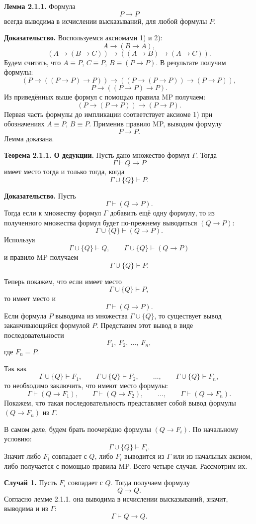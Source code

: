 \documentclass[12pt,letterpaper]{article}
\begin{document}
\textbf{Лемма 2.1.1.} Формула
\[
P \to P
\]
всегда выводима в исчислении высказываний, для любой формулы $P$.

\textbf{Доказательство.} Воспользуемся аксиомами 1) и 2):
\[
A \to (B \to A),
\]
\[
(A \to (B \to C)) \to ((A \to B) \to (A \to C)).
\]
Будем считать, что $A \equiv P$, $C \equiv P$, $B \equiv (P \to P)$. В результате получим формулы:
\[
(P \to ((P \to P)\to P)) \to ((P \to (P \to P)) \to (P \to P)),
\]
\[
P \to ((P \to P)\to P).
\]
Из приведённых выше формул с помощью правила MP получаем:
\[
(P \to (P \to P)) \to (P \to P).
\]
Первая часть формулы до импликации соответствует аксиоме 1) при обозначениях $A \equiv P$, $B \equiv P$. Применив правило MP, выводим формулу
\[
P \to P.
\]
Лемма доказана.

\textbf{Теорема 2.1.1. О дедукции.} Пусть дано множество формул $\Gamma$. Тогда
\[
\Gamma \vdash Q \to P
\]
имеет место тогда и только тогда, когда
\[
\Gamma \cup \{Q\}\vdash P.
\]

\textbf{Доказательство.} Пусть
\[
\Gamma \vdash (Q \to P).
\]
Тогда если к множеству формул $\Gamma$ добавить ещё одну формулу, то из полученного множества формул будет по-прежнему выводиться $(Q \to P)$:
\[
\Gamma \cup \{Q\}\vdash (Q \to P).
\]
Используя
\[
\Gamma \cup \{Q\}\vdash Q,\qquad \Gamma \cup \{Q\}\vdash (Q \to P)
\]
и правило MP получаем
\[
\Gamma \cup \{Q\}\vdash P.
\]

Теперь покажем, что если имеет место
\[
\Gamma \cup \{Q\}\vdash P,
\]
то имеет место и
\[
\Gamma \vdash (Q \to P).
\]
Если формула $P$ выводима из множества $\Gamma \cup \{Q\}$, то существует вывод заканчивающийся формулой $P$. Представим этот вывод в виде последовательности
\[
F_1,\ F_2,\ \dots,\ F_n,
\]
где $F_n=P$.

Так как
\[
\Gamma \cup \{Q\}\vdash F_1,\qquad \Gamma \cup \{Q\}\vdash F_2,\qquad \dots,\qquad \Gamma \cup \{Q\}\vdash F_n,
\]
то необходимо заключить, что имеют место формулы:
\[
\Gamma \vdash (Q \to F_1),\qquad \Gamma \vdash (Q \to F_2),\qquad \dots,\qquad \Gamma \vdash (Q \to F_n).
\]
Покажем, что такая последовательность представляет собой вывод формулы $(Q \to F_n)$ из $\Gamma$.

В самом деле, будем брать поочерёдно формулы $(Q \to F_i)$. По начальному условию:
\[
\Gamma \cup \{Q\}\vdash F_i.
\]
Значит либо $F_i$ совпадает с $Q$, либо $F_i$ выводится из $\Gamma$ или из начальных аксиом, либо получается с помощью правила MP. Всего четыре случая. Рассмотрим их.

\textbf{Случай 1.} Пусть $F_i$ совпадает с $Q$. Тогда получаем формулу
\[
Q \to Q.
\]
Согласно лемме 2.1.1. она выводима в исчислении высказываний, значит, выводима и из $\Gamma$:
\[
\Gamma \vdash Q \to Q.
\]
\end{document}
